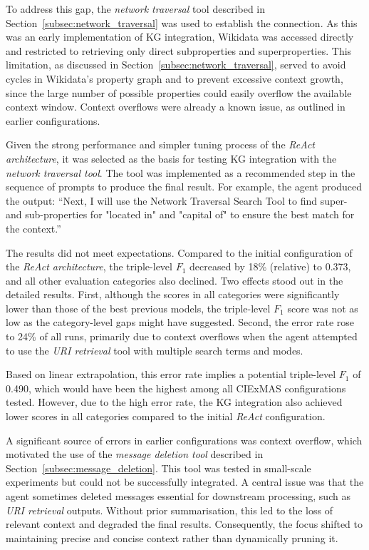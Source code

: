 \documentclass[a4paper,oneside,bibliography=totoc]{scrbook}
\begin{document}
To address this gap, the \textit{network traversal} tool described in Section~\ref{subsec:network_traversal} was used to establish the connection. As this was an early implementation of \ac{KG} integration, Wikidata was accessed directly and restricted to retrieving only direct subproperties and superproperties. This limitation, as discussed in Section~\ref{subsec:network_traversal}, served to avoid cycles in Wikidata's property graph and to prevent excessive context growth, since the large number of possible properties could easily overflow the available context window. Context overflows were already a known issue, as outlined in earlier configurations.

Given the strong performance and simpler tuning process of the \textit{\ac{ReAct} architecture}, it was selected as the basis for testing \ac{KG} integration with the \textit{network traversal tool}. The tool was implemented as a recommended step in the sequence of prompts to produce the final result. For example, the agent produced the output: \enquote{Next, I will use the Network Traversal Search Tool to find super- and sub-properties for "located in" and "capital of" to ensure the best match for the context.}

The results did not meet expectations. Compared to the initial configuration of the \textit{\ac{ReAct} architecture}, the triple-level $F_{1}$ decreased by 18\% (relative) to 0.373, and all other evaluation categories also declined. Two effects stood out in the detailed results. First, although the scores in all categories were significantly lower than those of the best previous models, the triple-level $F_{1}$ score was not as low as the category-level gaps might have suggested. Second, the error rate rose to 24\% of all runs, primarily due to context overflows when the agent attempted to use the \textit{\ac{URI} retrieval} tool with multiple search terms and modes.

Based on linear extrapolation, this error rate implies a potential triple-level $F_{1}$ of 0.490, which would have been the highest among all CIExMAS configurations tested. However, due to the high error rate, the \ac{KG} integration also achieved lower scores in all categories compared to the initial \textit{\ac{ReAct}} configuration.

A significant source of errors in earlier configurations was context overflow, which motivated the use of the \textit{message deletion tool} described in Section~\ref{subsec:message_deletion}. This tool was tested in small-scale experiments but could not be successfully integrated. A central issue was that the agent sometimes deleted messages essential for downstream processing, such as \textit{\ac{URI} retrieval} outputs. Without prior summarisation, this led to the loss of relevant context and degraded the final results. Consequently, the focus shifted to maintaining precise and concise context rather than dynamically pruning it.
\end{document}
